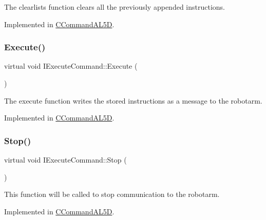 The clearlists function clears all the previously appended instructions. 



Implemented in \hyperlink{classCCommandAL5D_a46f133aa4b243af59e02f2cc23b12aa3}{C\+Command\+A\+L5D}.

\mbox{\label{classIExecuteCommand_a8180d6931ffae55f04f9984d45a9c99f}} 
\subsubsection{\texorpdfstring{Execute()}{Execute()}}
{\footnotesize\ttfamily virtual void I\+Execute\+Command\+::\+Execute (\begin{DoxyParamCaption}{ }\end{DoxyParamCaption})\hspace{0.3cm}{\ttfamily [pure virtual]}}



The execute function writes the stored instructions as a message to the robotarm. 



Implemented in \hyperlink{classCCommandAL5D_ac225e1c103a802a9276f201c94281ae2}{C\+Command\+A\+L5D}.

\mbox{\label{classIExecuteCommand_a9aaabaf7284c9d295c6e2fdfc1445ca4}} 
\subsubsection{\texorpdfstring{Stop()}{Stop()}}
{\footnotesize\ttfamily virtual void I\+Execute\+Command\+::\+Stop (\begin{DoxyParamCaption}{ }\end{DoxyParamCaption})\hspace{0.3cm}{\ttfamily [pure virtual]}}



This function will be called to stop communication to the robotarm. 



Implemented in \hyperlink{classCCommandAL5D_a3cd260bd7bf8b4aa72dacc1d1ef2d38b}{C\+Command\+A\+L5D}.

\mbox{\label{classIExecuteCommand_a266571b3fc97e79be6e00b0df4c5a4ac}} 

